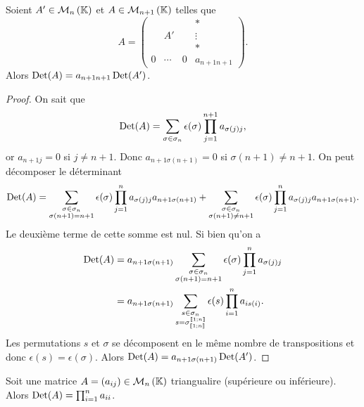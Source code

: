 \begin{prop}
  Soient \(A' \in \mathcal{M}_{n}\left(\mathbb{K}\right)\) et \(A \in \mathcal{M}_{n+1}\left(\mathbb{K}\right)\) telles que
  \begin{equation}
    A =
    \begin{pmatrix}
      &        &  & *        \\
      & A'     &  & \vdots   \\
      &        &  & *        \\
      0 & \cdots &0 & a_{n+1 n+1}
    \end{pmatrix}.
  \end{equation}
  Alors \(\operatorname{Det}(A) = a_{n+1 n+1} \operatorname{Det}(A')\).
\end{prop}
\begin{proof}
  On sait que
  \begin{equation}
    \operatorname{Det}(A) = \sum_{\sigma \in \sigma_n}\epsilon(\sigma) \prod_{j=1}^{n+1}
    a_{\sigma(j)j},
  \end{equation}
  or \(a_{n+1 j}=0\) si \(j \neq n+1\). Donc \(a_{n+1 \sigma(n+1)}=0\) si
  \(\sigma(n+1) \neq n+1\). On peut décomposer le déterminant
  \begin{equation}
    \operatorname{Det}(A) = \sum_{\substack{\sigma \in \sigma_n\\
    \sigma(n+1)=n+1}}\epsilon(\sigma) \prod_{j=1}^n a_{\sigma(j)j}a_{n+1
    \sigma(n+1)} + \sum_{\substack{\sigma \in \sigma_n\\ \sigma(n+1)\neq
    n+1}}\epsilon(\sigma) \prod_{j=1}^n a_{\sigma(j)j}a_{n+1 \sigma(n+1)}.
  \end{equation}
  Le deuxième terme de cette somme est nul. Si bien qu'on a
  \begin{align}
    \operatorname{Det}(A) &= a_{n+1 \sigma(n+1)} \sum_{\substack{\sigma \in \sigma_n\\
    \sigma(n+1)=n+1}}\epsilon(\sigma) \prod_{j=1}^n a_{\sigma(j)j} \\
    &= a_{n+1 \sigma(n+1)} \sum_{\substack{s \in \sigma_n\\
    s=\sigma_{\mathopen{\llbracket}1\mathclose{}\mathpunct{};n\mathclose{\rrbracket}}^{\mathopen{\llbracket}1\mathclose{}\mathpunct{};n\mathclose{\rrbracket}}}}\epsilon(s)
    \prod_{i=1}^n a_{is(i)}.
  \end{align}
  Les permutations \(s\) et \(\sigma\) se décomposent en le même nombre de
  transpositions et donc \(\epsilon(s) = \epsilon(\sigma)\). Alors \(\operatorname{Det}(A)
  = a_{n+1 \sigma(n+1)} \operatorname{Det}(A')\).
\end{proof}
%
\begin{corth}
  Soit une matrice \(A=(a_{ij}) \in \mathcal{M}_{n}\left(\mathbb{K}\right)\) triangualire (supérieure ou
  inférieure). Alors \(\operatorname{Det}(A) = \prod_{i=1}^n a_{ii}\).
\end{corth}
